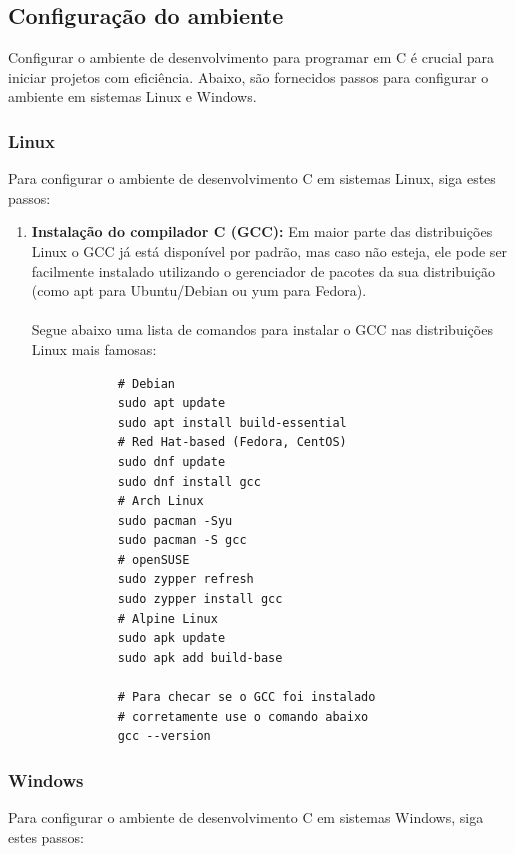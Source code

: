 \documentclass{book}
\begin{document}
\subsection{Configuração do ambiente}

Configurar o ambiente de desenvolvimento para programar em C é crucial para 
iniciar projetos com eficiência. Abaixo, são fornecidos passos para configurar 
o ambiente em sistemas Linux e Windows.

\subsubsection{Linux}

Para configurar o ambiente de desenvolvimento C em sistemas Linux, siga estes passos:

\begin{enumerate}
    \item \textbf{Instalação do compilador C (GCC):} 
        Em maior parte das distribuições Linux o GCC já está disponível por padrão, 
        mas caso não esteja, ele pode ser facilmente instalado utilizando o gerenciador 
        de pacotes da sua distribuição (como apt para Ubuntu/Debian ou yum para Fedora).
        \\\\
        Segue abaixo uma lista de comandos para instalar o GCC nas distribuições Linux 
        mais famosas:

        \begin{verbatim}
            # Debian
            sudo apt update
            sudo apt install build-essential
            # Red Hat-based (Fedora, CentOS)
            sudo dnf update
            sudo dnf install gcc
            # Arch Linux
            sudo pacman -Syu
            sudo pacman -S gcc
            # openSUSE
            sudo zypper refresh
            sudo zypper install gcc
            # Alpine Linux
            sudo apk update
            sudo apk add build-base

            # Para checar se o GCC foi instalado 
            # corretamente use o comando abaixo
            gcc --version
        \end{verbatim}
\end{enumerate}

\subsubsection{Windows}

Para configurar o ambiente de desenvolvimento C em sistemas Windows, siga 
estes passos:
\end{document}
